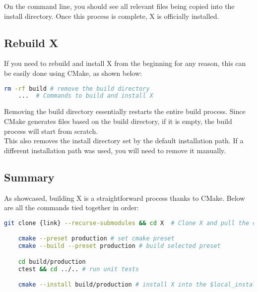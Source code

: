 \documentclass[a4paper,12pt]{article}
\begin{document}
On the command line, you should see all relevant files being copied into the install directory. Once this process is complete, X is officially installed. \\

\subsection{Rebuild X}

If you need to rebuild and install X from the beginning for any reason, this can be easily done using CMake, as shown below:

\vspace{1em}
\begin{lstlisting}[language=bash]
    rm -rf build # remove the build directory
    ...  # Commands to build and install X
\end{lstlisting}
\vspace{1em}

Removing the build directory essentially restarts the entire build process. Since CMake generates files based on the build directory, if it is empty, the build process will start from scratch.  \\

This also removes the install directory set by the default installation path. If a different installation path was used, you will need to remove it manually. 

\subsection{Summary}

As showcased, building X is a straightforward process thanks to CMake. Below are all the commands tied together in order:

\vspace{1em}
\begin{lstlisting}[language=bash]
    git clone {link} --recurse-submodules && cd X  # Clone X and pull the contents of its submodules

    cmake --preset production # set cmake preset 
    cmake --build --preset production # build selected preset 

    cd build/production 
    ctest && cd ../.. # run unit tests 

    cmake --install build/production # install X into the $local_install directory
\end{lstlisting}
\vspace{1em}
\end{document}
